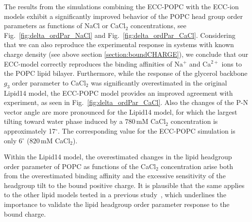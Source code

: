 \documentclass[aip,jcp,twocolumn]{revtex4}
\begin{document}
The results from the simulations combining the ECC-POPC with the ECC-ion models \cite{martinek17, kohagen16, Pluharova2014} exhibit a significantly improved behavior of the POPC head group order parameters as functions of NaCl or CaCl$_2$ concentrations, see Fig.~\ref{fig:delta_ordPar_NaCl} and Fig.~\ref{fig:delta_ordPar_CaCl}. Considering that we can also reproduce the experimental response in systems with known charge density (see above section \ref{section:boundCHARGE}), we conclude that our ECC-model correctly reproduces the binding affinities of Na$^{+}$ and Ca$^{2+}$ ions to the POPC lipid bilayer. Furthermore, while the response of the glycerol backbone $g_3$ order parameter to CaCl$_2$ was significantly overestimated in the original Lipid14 model, the ECC-POPC model provides an improved agreement with experiment, as seen in Fig.~\ref{fig:delta_ordPar_CaCl}.
Also the changes of the P-N vector angle are more pronounced for the Lipid14 model,
for which the largest tilting toward water phase induced by a $780\,\mathrm{mM}$
CaCl$_2$ concentration is approximately 17$^{\circ}$. The corresponding value
for the ECC-POPC simulation is only 6$^{\circ}$ ($820\,\mathrm{mM}$ CaCl$_2$). 

Within the Lipid14 model, the overestimated changes in the lipid headgroup order parameter of POPC  as functions of the CaCl$_2$ concentration arise both from the overestimated binding affinity and the excessive sensitivity of the headgroup tilt to the bound positive charge. It is plausible that the same applies to the other lipid models tested in a previous study~\cite{catte16}, which underlines the importance to validate the lipid headgroup order parameter response to the bound charge. 
\end{document}
